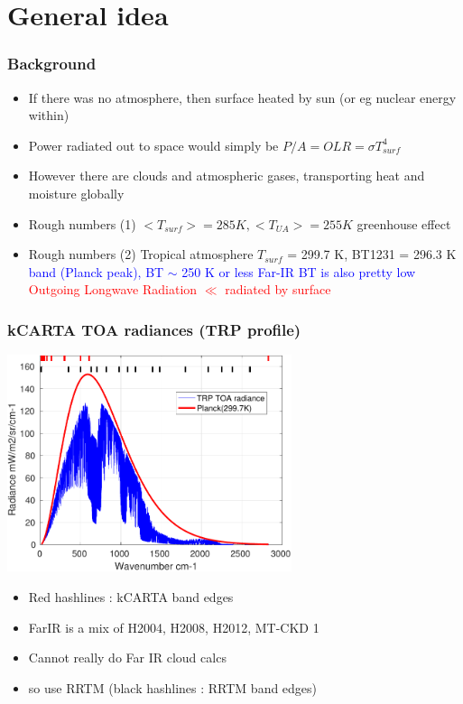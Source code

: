 \documentclass[10pt,t]{beamer}
\begin{document}
\section{General idea}
\begin{frame}
  \frametitle{Background}
  \begin{itemize}
  \item If there was no atmosphere, then surface heated by sun (or eg nuclear energy within)
  \item Power radiated out to space would simply be $P/A = OLR = \sigma T_{surf}^4$ 
  \item However there are clouds and atmospheric gases, transporting heat and moisture globally
  \item Rough numbers (1) $ <T_{surf}> = 285 K, <T_{UA}> = 255 K$ greenhouse effect
  \item Rough numbers (2) Tropical atmosphere $T_{surf}$ = 299.7 K, BT1231 = 296.3 K \newline
    \textcolor{blue}{ \um band (Planck peak), BT $\sim$ 250 K or less} \newline
    \textcolor{blue}{\water Far-IR  BT is also pretty low} \newline
    \textcolor{red}{Outgoing Longwave Radiation $\ll$ radiated by surface}
  \end{itemize}
\end{frame}
\begin{frame}
  \frametitle{kCARTA TOA radiances (TRP profile)}

  \begin{center}
    \noindent\includegraphics[width=0.625\textwidth]{Figs/generic_planckTOArads.pdf}
  \end{center}
  
  \begin{itemize}  
  \item Red hashlines : kCARTA band edges
  \item FarIR is a mix of H2004, H2008, H2012, MT-CKD 1
  \item Cannot really do Far IR cloud calcs
  \item so use RRTM (black hashlines : RRTM band edges)
  \end{itemize}

\end{frame}
\end{document}
